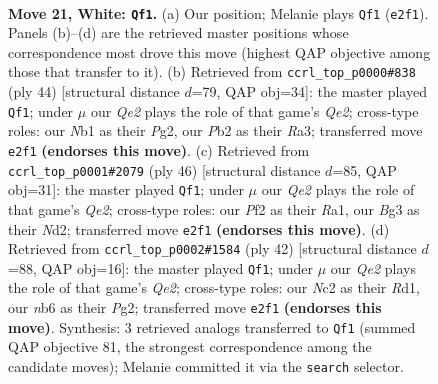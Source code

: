 \documentclass[11pt]{article}
\begin{document}
\clearpage

\begin{figure}[p]\centering
\begin{subfigure}{0.46\textwidth}\centering
\resizebox{\linewidth}{!}{%
\newchessgame
\chessboard[
  setfen={r5k1/pp3pbp/1nn2qp1/3p1b2/3P4/1B4BP/PPN1QPP1/RN4K1 w - - 7 21},
  showmover=false,
  pgfstyle=straightmove, color=movearrow, markmove={e2-f1}
]}
\caption{}
\end{subfigure}\hfill
\begin{subfigure}{0.46\textwidth}\centering
\resizebox{\linewidth}{!}{%
\newchessgame
\chessboard[
  setfen={2bq1bk1/r4p2/p2p1npp/P1pP4/2B5/R1N4P/1P1BQPP1/6K1 w - - 1 23},
  showmover=false,
  pgfstyle=straightmove, color=movearrow, markmove={e2-f1}
]}
\caption{}
\end{subfigure}
\\[4pt]
\begin{subfigure}{0.46\textwidth}\centering
\resizebox{\linewidth}{!}{%
\newchessgame
\chessboard[
  setfen={1r3bk1/2pq1pp1/2b1nn1p/Np2p3/1P2P3/2PBB2P/3NQPP1/R5K1 w - - 8 24},
  showmover=false,
  pgfstyle=straightmove, color=movearrow, markmove={e2-f1}
]}
\caption{}
\end{subfigure}\hfill
\begin{subfigure}{0.46\textwidth}\centering
\resizebox{\linewidth}{!}{%
\newchessgame
\chessboard[
  setfen={b2r1bk1/pq3pp1/1p2p2p/3n4/4N3/PP1BP2P/1B2QPP1/3R2K1 w - - 3 22},
  showmover=false,
  pgfstyle=straightmove, color=movearrow, markmove={e2-f1}
]}
\caption{}
\end{subfigure}
\caption{\textbf{Move 21, White: \texttt{Qf1}.} (a) Our position; Melanie plays \texttt{Qf1} (\texttt{e2f1}). Panels (b)--(d) are the retrieved master positions whose correspondence most drove this move (highest QAP objective among those that transfer to it). (b) Retrieved from \texttt{ccrl\_top\_p0000\#838} (ply 44) [structural distance $d$=79, QAP obj=34]: the master played \texttt{Qf1}; under $\mu$ our \emph{Qe2} plays the role of that game's \emph{Qe2}; cross-type roles: our \emph{N}b1 as their \emph{P}g2, our \emph{P}b2 as their \emph{R}a3; transferred move \texttt{e2f1} \textbf{(endorses this move)}. (c) Retrieved from \texttt{ccrl\_top\_p0001\#2079} (ply 46) [structural distance $d$=85, QAP obj=31]: the master played \texttt{Qf1}; under $\mu$ our \emph{Qe2} plays the role of that game's \emph{Qe2}; cross-type roles: our \emph{P}f2 as their \emph{R}a1, our \emph{B}g3 as their \emph{N}d2; transferred move \texttt{e2f1} \textbf{(endorses this move)}. (d) Retrieved from \texttt{ccrl\_top\_p0002\#1584} (ply 42) [structural distance $d$=88, QAP obj=16]: the master played \texttt{Qf1}; under $\mu$ our \emph{Qe2} plays the role of that game's \emph{Qe2}; cross-type roles: our \emph{N}c2 as their \emph{R}d1, our \emph{n}b6 as their \emph{P}g2; transferred move \texttt{e2f1} \textbf{(endorses this move)}. Synthesis: 3 retrieved analogs transferred to \texttt{Qf1} (summed QAP objective 81, the strongest correspondence among the candidate moves); Melanie committed it via the \texttt{search} selector.}
\label{fig:thought-m40}
\end{figure}
\end{document}
